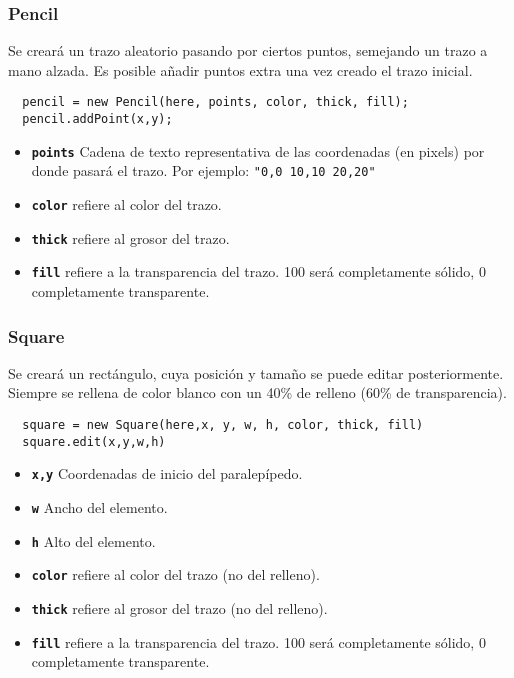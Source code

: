 
\subsubsection{Pencil} %
\label{ssub:pencil}

Se creará un trazo aleatorio pasando por ciertos puntos, semejando un trazo a mano alzada. Es posible añadir puntos extra una vez creado el trazo inicial.

\begin{verbatim}
  pencil = new Pencil(here, points, color, thick, fill);
  pencil.addPoint(x,y);
\end{verbatim}

\begin{itemize}
  \item \textbf{\texttt{points}} Cadena de texto representativa de las coordenadas (en pixels) por donde pasará el trazo. Por ejemplo: \texttt{"0,0 10,10 20,20"}
  \item \textbf{\texttt{color}} refiere al color del trazo.
  \item \textbf{\texttt{thick}} refiere al grosor del trazo.
  \item \textbf{\texttt{fill}} refiere a la transparencia del trazo. 100 será completamente sólido, 0 completamente transparente.
\end{itemize}


\subsubsection{Square} %
\label{ssub:square}

Se creará un rectángulo, cuya posición y tamaño se puede editar posteriormente. Siempre se rellena de color blanco con un 40\% de relleno (60\% de transparencia).

\begin{verbatim}
  square = new Square(here,x, y, w, h, color, thick, fill)
  square.edit(x,y,w,h)
\end{verbatim}

\begin{itemize}
  \item \textbf{\texttt{x,y}} Coordenadas de inicio del paralepípedo.
  \item \textbf{\texttt{w}} Ancho del elemento.
  \item \textbf{\texttt{h}} Alto del elemento.
  \item \textbf{\texttt{color}} refiere al color del trazo (no del relleno).
  \item \textbf{\texttt{thick}} refiere al grosor del trazo (no del relleno).
  \item \textbf{\texttt{fill}} refiere a la transparencia del trazo. 100 será completamente sólido, 0 completamente transparente.
\end{itemize}

